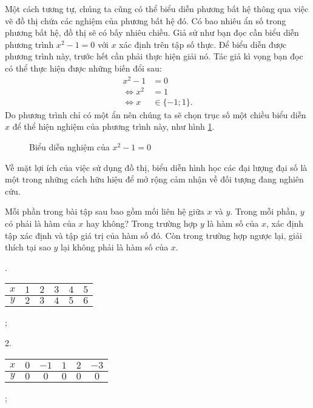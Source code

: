 Một cách tương tự, chúng ta cũng có thể biểu diễn phương bất hệ thông qua việc vẽ đồ thị chứa các nghiệm của phương bất hệ đó. Có bao nhiêu ẩn số trong phương bất hệ, đồ thị sẽ có bấy nhiêu chiều. Giả sử như bạn đọc cần biểu diễn phương trình $x^2 - 1 = 0$ với $x$ xác định trên tập số thực. Để biểu diễn được phương trình này, trước hết cần phải thực hiện giải nó. Tác giả kì vọng bạn đọc có thể thực hiện được những biến đổi sau:
\begin{align*}
   x^2 - 1 &= 0 \\
   \iff x^2 &= 1 \\
   \iff x &\in \{-1; 1\}.
\end{align*}
Do phương trình chỉ có một ẩn nên chúng ta sẽ chọn trục số một chiều biểu diễn $x$ để thể hiện nghiệm của phương trình này, như hình \ref{fig:ham_so_mot_bien:dinh_nghia:vdgpt}.

\begin{figure}[h]
   \centering
   \caption{Biểu diễn nghiệm của $x^2 - 1 = 0$}
   \label{fig:ham_so_mot_bien:dinh_nghia:vdgpt}
\end{figure}

Về mặt lợi ích của việc sử dụng đồ thị, biểu diễn hình học các đại lượng đại số là một trong những cách hữu hiệu để mở rộng cảm nhận về đối tượng đang nghiên cứu.
      
\exercise Mỗi phần trong bài tập sau bao gồm mối liên hệ giữa $x$ và $y$. Trong mỗi phần, $y$ có phải là hàm của $x$ hay không? Trong trường hợp $y$ là hàm số của $x$, xác định tập xác định và tập giá trị của hàm số đó. Còn trong trường hợp ngược lại, giải thích tại sao $y$ lại không phải là hàm số của $x$.

\setcounter{subexercise}{1}
.
\begin{tabular}{|c|c|c|c|c|c|}
   \hline
   $x$ & $1$ & $2$ & $3$ & $4$ & $5$ \\
   \hline
   $y$ & $2$ & $3$ & $4$ & $5$ & $6$ \\
   \hline
\end{tabular};

2.
\begin{tabular}{|c|c|c|c|c|c|}
   \hline
   $x$ & $0$ & $-1$ & $1$ & $2$ & $-3$ \\
   \hline
   $y$ & $0$ & $0$ & $0$ & $0$ & $0$ \\
   \hline
\end{tabular};


